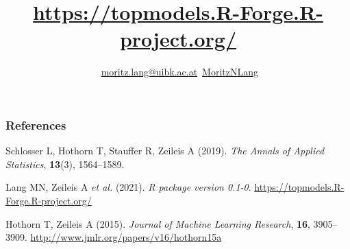 \documentclass[11pt,t,usepdftitle=false,aspectratio=169]{beamer}
\begin{document}
\begin{frame}
\frametitle{References}

\footnotesize

Schlosser L, Hothorn T, Stauffer R, Zeileis A (2019).
\emph{The Annals of Applied Statistics}, \textbf{13}(3), 1564--1589.

\medskip

Lang MN, Zeileis A \emph{et al.} (2021).
\emph{R package version 0.1-0}.
\url{https://topmodels.R-Forge.R-project.org/}

\medskip

Hothorn T, Zeileis A (2015).
 \emph{Journal of Machine Learning Research},
 \textbf{16}, 3905--3909.
 \url{http://www.jmlr.org/papers/v16/hothorn15a}

% 
% 
% 
%  
% 
% 
%  
% 

\end{frame}


\title[]{\large{\color{uibkgraym}\url{https://topmodels.R-Forge.R-project.org/}}}
\author[]{\footnotesize \faEnvelope\,\,\href{mailto:moritz.lang@uibk.ac.at}{moritz.lang@uibk.ac.at} \hspace{1em} \faTwitter\,\href{https://twitter.com/MoritzNLang}{MoritzNLang}}
\URL{}
\end{document}
